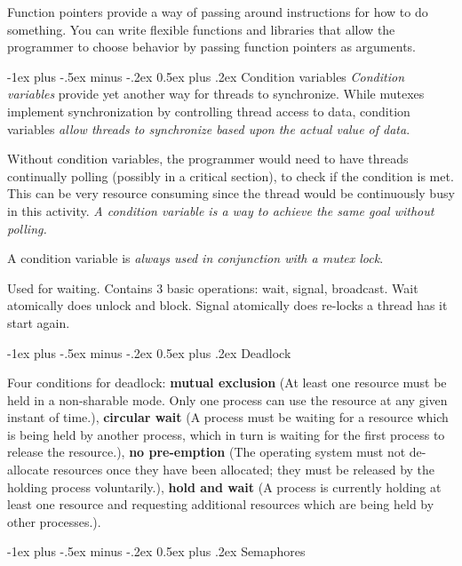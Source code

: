 \documentclass[10pt,landscape, a4paper]{article}
\makeatletter
\renewcommand{\section}{\@startsection{section}{1}{0mm}%
                                {-1ex plus -.5ex minus -.2ex}%
                                {0.5ex plus .2ex}%
                                {\normalfont\large\bfseries}}
\makeatother
\begin{document}
\begin{multicols}{3}


Function pointers provide a way of passing around instructions for 
how to do something. You can write flexible functions and libraries 
that allow the programmer to choose behavior by passing function pointers 
as arguments.

\section{Condition variables}
\emph{Condition variables} provide yet another way for threads to synchronize. 
While mutexes implement synchronization by controlling thread access to data, 
condition variables \emph{allow threads to synchronize based upon the actual value of data}.

Without condition variables, the programmer would need to have threads 
continually polling (possibly in a critical section), to check if the 
condition is met. This can be very resource consuming since the thread 
would be continuously busy in this activity. \emph{A condition variable is a 
way to achieve the same goal without polling.}

A condition variable is \emph{always used in conjunction with a mutex lock}.

Used for waiting. Contains 3 basic operations: wait, signal, broadcast. 
Wait atomically does unlock and block. Signal atomically does re-locks a 
thread has it start again.

\section{Deadlock}

Four conditions for deadlock: \textbf{mutual exclusion} (At least one resource must be held in a non-sharable mode. Only one process can use the resource at any given instant of time.), \textbf{circular wait} (A process must be waiting for a resource which is being held by another process, which in turn is waiting for the first process to release the resource.), \textbf{no pre-emption} (The operating system must not de-allocate resources once they have been allocated; they must be released by the holding process voluntarily.), \textbf{hold and wait} (A process is currently holding at least one resource and requesting additional resources which are being held by other processes.). 

\section{Semaphores}


\end{multicols}
\end{document}
